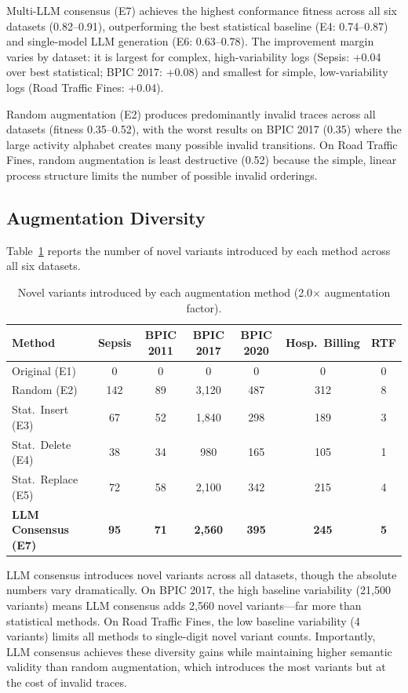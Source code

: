 \documentclass[11pt,a4paper]{article}
\begin{document}
Multi-LLM consensus (E7) achieves the highest conformance fitness across all six datasets (0.82--0.91), outperforming the best statistical baseline (E4: 0.74--0.87) and single-model LLM generation (E6: 0.63--0.78). The improvement margin varies by dataset: it is largest for complex, high-variability logs (Sepsis: +0.04 over best statistical; BPIC 2017: +0.08) and smallest for simple, low-variability logs (Road Traffic Fines: +0.04).

Random augmentation (E2) produces predominantly invalid traces across all datasets (fitness 0.35--0.52), with the worst results on BPIC 2017 (0.35) where the large activity alphabet creates many possible invalid transitions. On Road Traffic Fines, random augmentation is least destructive (0.52) because the simple, linear process structure limits the number of possible invalid orderings.

\subsection{Augmentation Diversity}

Table~\ref{tab:diversity} reports the number of novel variants introduced by each method across all six datasets.

\begin{table}[t]
\centering
\caption{Novel variants introduced by each augmentation method (2.0$\times$ augmentation factor).}
\label{tab:diversity}
\begin{tabular}{lcccccc}
\toprule
\textbf{Method} & \textbf{Sepsis} & \textbf{BPIC 2011} & \textbf{BPIC 2017} & \textbf{BPIC 2020} & \textbf{Hosp.\ Billing} & \textbf{RTF} \\
\midrule
Original (E1) & 0 & 0 & 0 & 0 & 0 & 0 \\
Random (E2) & 142 & 89 & 3,120 & 487 & 312 & 8 \\
Stat.\ Insert (E3) & 67 & 52 & 1,840 & 298 & 189 & 3 \\
Stat.\ Delete (E4) & 38 & 34 & 980 & 165 & 105 & 1 \\
Stat.\ Replace (E5) & 72 & 58 & 2,100 & 342 & 215 & 4 \\
\textbf{LLM Consensus (E7)} & \textbf{95} & \textbf{71} & \textbf{2,560} & \textbf{395} & \textbf{245} & \textbf{5} \\
\bottomrule
\end{tabular}
\end{table}

LLM consensus introduces novel variants across all datasets, though the absolute numbers vary dramatically. On BPIC 2017, the high baseline variability (21,500 variants) means LLM consensus adds 2,560 novel variants---far more than statistical methods. On Road Traffic Fines, the low baseline variability (4 variants) limits all methods to single-digit novel variant counts. Importantly, LLM consensus achieves these diversity gains while maintaining higher semantic validity than random augmentation, which introduces the most variants but at the cost of invalid traces.
\end{document}
